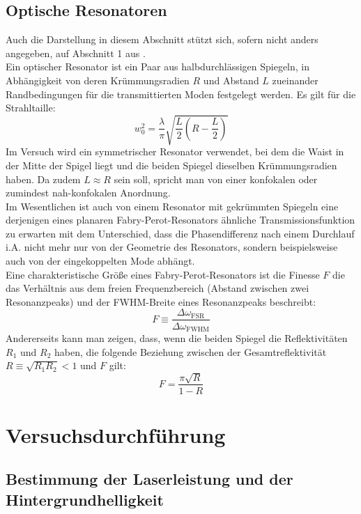 \documentclass[11pt,a4paper,oneside]{scrartcl}
\begin{document}
\subsection{Optische Resonatoren}
Auch die Darstellung in diesem Abschnitt stützt sich, sofern nicht anders angegeben, auf Abschnitt 1 aus \cite{versuchsanleitung}. \\
Ein optischer Resonator ist ein Paar aus halbdurchlässigen Spiegeln, in Abhängigkeit von deren Krümmungsradien $R$ und Abstand $L$ zueinander Randbedingungen für die transmittierten Moden festgelegt werden. Es gilt für die Strahltaille:
\begin{equation}
w_0^2=\frac{\lambda}{\pi}\sqrt{\frac{L}{2}\left(R-\frac{L}{2}\right)}
\end{equation}
Im Versuch wird ein symmetrischer Resonator verwendet, bei dem die Waist in der Mitte der Spigel liegt und die beiden Spiegel dieselben Krümmungsradien haben. Da zudem $L\approx R$ sein soll, spricht man von einer konfokalen oder zumindest nah-konfokalen Anordnung.\\
Im Wesentlichen ist auch von einem Resonator mit gekrümmten Spiegeln eine derjenigen eines planaren Fabry-Perot-Resonators ähnliche Transmissionsfunktion zu erwarten mit dem Unterschied, dass die Phasendifferenz nach einem Durchlauf i.A. nicht mehr nur von der Geometrie des Resonators, sondern beispielsweise auch von der eingekoppelten Mode abhängt. \\
Eine charakteristische Größe eines Fabry-Perot-Resonators ist die Finesse $F$ die das Verhältnis aus dem freien Frequenzbereich (Abstand zwischen zwei Resonanzpeaks) und der FWHM-Breite eines Resonanzpeaks beschreibt:
\begin{equation}
F\equiv \frac{\Delta \omega_{\mathrm{FSR}}}{\Delta \omega_{\mathrm{FWHM}}}
\end{equation}
Andererseits kann man zeigen, dass, wenn die beiden Spiegel die Reflektivitäten $R_1$ und $R_2$ haben, die folgende Beziehung zwischen der Gesamtreflektivität $R\equiv \sqrt{R_1R_2}<1$ und $F$ gilt:
\begin{equation}
F= \frac{\pi\sqrt{R}}{1-R}
\end{equation}
\section{Versuchsdurchführung}
\subsection{Bestimmung der Laserleistung und der Hintergrundhelligkeit}
\end{document}
